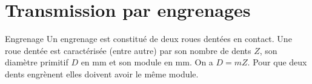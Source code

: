 \def\xxactivite{Cours}
\def\xxauteur{\textsl{Xavier Pessoles}}

\fichetrue
\proftrue
\tdfalse
\coursfalse

\def\xxnumpartie{Rév -- Cin}
\def\xxpartie{Modélisation des actions mécaniques dans les systèmes}
\def\xxnumchapitre{ Révisions 4\vspace{.2cm}}
\def\xxchapitre{\hspace{.12cm} Transmetteurs de puissance}

\def\xxpied{%
Révisions Cinématique -- \xxchapitre \\
Fiche 4 -- \xxactivite%
}


\def\xxcompetences{%
\textsl{%
\textbf{Savoirs et compétences :}\\
}}


\iflivret

\else

\fi
\setlength{\columnseprule}{.1pt}

\vspace{2cm}
\pagestyle{fancy}
\thispagestyle{plain}

\section*{Transmission par engrenages}
\begin{defi}{Engrenage}
Un engrenage est constitué de deux roues dentées en contact. Une roue dentée est caractérisée (entre autre) par son nombre de dents $Z$, son diamètre primitif $D$ en \si{mm} et son module en \si{mm}. On a $D=mZ$.
Pour que deux dents engrènent elles doivent avoir le même module.
\end{defi}

